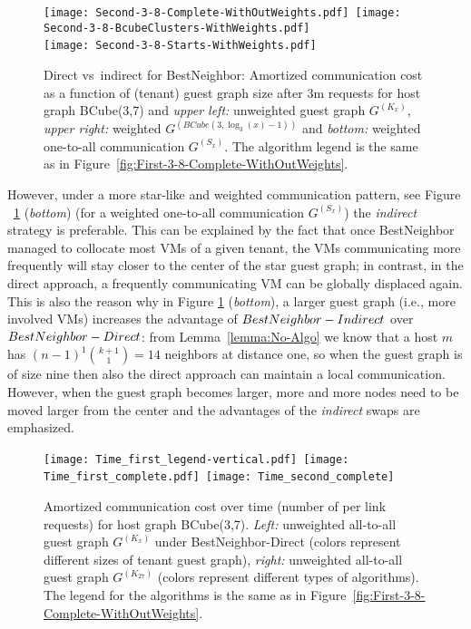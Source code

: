 \documentclass[conference]{IEEEtran}
\def\BC#1#2{BCube(#1,#2)}
\newcommand{\BestNeighborI}{{\sc BestNeighbor-Indirect} }
\newcommand{\BestNeighborD}{{\sc BestNeighbor-Direct} }
\begin{document}
	\begin{figure}[h]
				\centering \texttt{[image: Second-3-8-Complete-WithOutWeights.pdf]}~\texttt{[image: Second-3-8-BcubeClusters-WithWeights.pdf]} \\
				\texttt{[image: Second-3-8-Starts-WithWeights.pdf]}~
				\caption{Direct vs~indirect for {\sc BestNeighbor}: Amortized communication cost as a function of (tenant) guest graph size after 3m requests for host graph \BC{3}{7}  and \emph{upper left:} unweighted guest graph $G^{(K_{x})}$, \emph{upper right:}
 weighted $G^{(\BC{3}{\log_3(x)-1})}$ and \emph{bottom:} weighted one-to-all communication $G^{(S_{x})}$. The algorithm legend is the same as in Figure~\ref{fig:First-3-8-Complete-WithOutWeights}.}
				\label{fig:Second-3-8-Complete-WithOutWeights}
				\end{figure}


However, under a more star-like and weighted communication pattern, see Figure ~\ref{fig:Second-3-8-Complete-WithOutWeights} (\emph{bottom}) (for a weighted one-to-all communication $G^{(S_{x})}$)
the \emph{indirect} strategy is preferable. This can be explained by the fact that once {\sc BestNeighbor} managed to collocate most VMs of a given tenant,
the VMs communicating more frequently will stay closer to the center of the star guest graph; in contrast, in the direct approach, a frequently communicating
VM can be globally displaced again. This is also the reason why in Figure \ref{fig:Second-3-8-Complete-WithOutWeights} (\emph{bottom}), a larger guest graph (i.e., more involved VMs) increases the advantage of $\BestNeighborI$ over $\BestNeighborD$: from Lemma~\ref{lemma:No-Algo} we know that a host $m$ has  $(n-1)^1 {k+1 \choose 1} = 14$ neighbors at distance one, so when the guest graph is of size nine then also the direct approach can maintain a local communication.
However, when the guest graph becomes larger, more and more nodes need to be moved larger from the center and the advantages of the \emph{indirect} swaps are emphasized.

				


				





\begin{figure}[h]
				\centering
				 \texttt{[image: Time\_first\_legend-vertical.pdf]}~\texttt{[image: Time\_first\_complete.pdf]}~\texttt{[image: Time\_second\_complete]}\\
				\caption{Amortized communication cost over time (number of per link requests) for host graph \BC{3}{7}. \emph{Left:} unweighted all-to-all guest graph $G^{(K_{x})}$ under \BestNeighborD (colors represent different sizes of tenant guest graph), \emph{right:} unweighted all-to-all guest graph $G^{(K_{27})}$ (colors represent different types of algorithms). The legend for the algorithms is the same as in Figure~\ref{fig:First-3-8-Complete-WithOutWeights}.}
				\label{fig:Time_first_complete}
				\end{figure}
\end{document}
